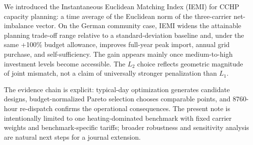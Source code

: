 We introduced the Instantaneous Euclidean Matching Index (IEMI) for CCHP capacity planning: a time average of the Euclidean norm of the three-carrier net-imbalance vector. On the German community case, IEMI widens the attainable planning trade-off range relative to a standard-deviation baseline and, under the same +100\% budget allowance, improves full-year peak import, annual grid purchase, and self-sufficiency. The gain appears mainly once medium-to-high investment levels become accessible. The $L_2$ choice reflects geometric magnitude of joint mismatch, not a claim of universally stronger penalization than $L_1$.

The evidence chain is explicit: typical-day optimization generates candidate designs, budget-normalized Pareto selection chooses comparable points, and 8760-hour re-dispatch confirms the operational consequences. The present note is intentionally limited to one heating-dominated benchmark with fixed carrier weights and benchmark-specific tariffs; broader robustness and sensitivity analysis are natural next steps for a journal extension.
